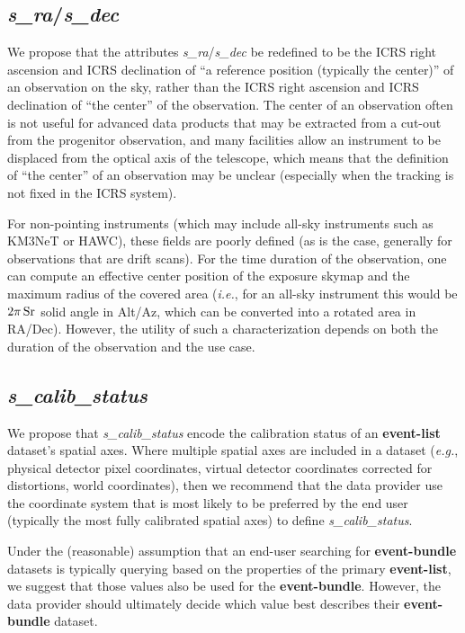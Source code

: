 \documentclass[11pt,a4paper]{ivoa}
\begin{document}
\subsection{{\em s\_ra\/}/{\em s\_dec}}

We propose that the attributes {\em s\_ra\/}/{\em s\_dec} be redefined to be the ICRS right ascension and ICRS declination of ``a reference position (typically the center)'' of an observation on the sky, rather than the ICRS right ascension and ICRS declination of ``the center'' of the observation.  The center of an observation often is not useful for advanced data products that may be extracted from a cut-out from the progenitor observation, and many facilities allow an instrument to be displaced from the optical axis of the telescope, which means that the definition of ``the center'' of an observation may be unclear (especially when the tracking is not fixed in the ICRS system).

For non-pointing instruments (which may include all-sky instruments such as KM3NeT or HAWC), these fields are poorly defined (as is the case, generally for observations that are drift scans).  For the time duration of the observation, one can compute an effective center position of the exposure skymap and the maximum radius of the covered area ({\em i.e.\/}, for an all-sky instrument this would be $2\pi\,\rm Sr$ solid angle in Alt/Az, which can be converted into a rotated area in RA/Dec). However, the utility of such a characterization depends on both the duration of the observation and the use case.

\subsection{{\em s\_calib\_status}}

We propose that {\em s\_calib\_status} encode the calibration status of an {\bf event-list} dataset's spatial axes. Where multiple spatial axes are included in a dataset ({\em e.g.\/}, physical detector pixel coordinates, virtual detector coordinates corrected for distortions, world coordinates), then we recommend that the data provider use the coordinate system that is most likely to be preferred by the end user (typically the most fully calibrated spatial axes) to define {\em s\_calib\_status\/}.

Under the (reasonable) assumption that an end-user searching for {\bf event-bundle} datasets is typically querying based on the properties of the primary {\bf event-list}, we suggest that those values also be used for the {\bf event-bundle}.  However, the data provider should ultimately decide which value best describes their {\bf event-bundle} dataset.
\end{document}
